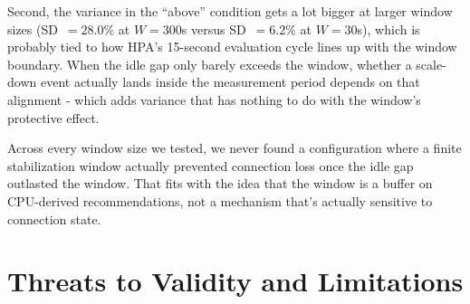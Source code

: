 \documentclass[twocolumn]{svjour3}
\begin{document}
Second, the variance in the ``above'' condition gets a lot bigger at larger window
sizes (SD~$= 28.0\%$ at $W=300$s versus SD~$= 6.2\%$ at $W=30$s), which is probably
tied to how HPA's 15-second evaluation cycle lines up with the window boundary.
When the idle gap only barely exceeds the window, whether a scale-down event
actually lands inside the measurement period depends on that alignment - which
adds variance that has nothing to do with the window's protective effect.

Across every window size we tested, we never found a configuration where a finite
stabilization window actually prevented connection loss once the idle gap outlasted
the window. That fits with the idea that the window is a buffer on CPU-derived
recommendations, not a mechanism that's actually sensitive to connection state.

\section{Threats to Validity and Limitations}
\label{sec:limitations}
\end{document}

